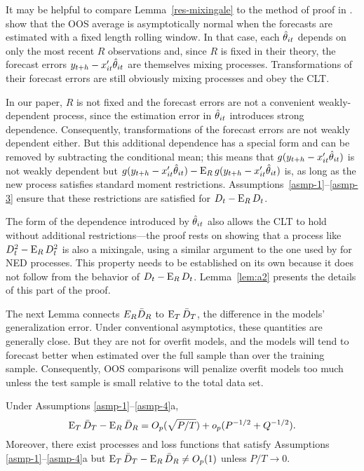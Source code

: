 \documentclass[12pt]{article}
\begin{document}
It may be helpful to compare Lemma~\ref{res-mixingale} to the method
of proof in \citet{GiW:06}. \citet{GiW:06} show that the OOS average
is asymptotically normal when the forecasts are estimated with a fixed
length rolling window. In that case, each $\hat\theta_{it}$ depends on only
the most recent $R$ observations and, since $R$ is fixed in their
theory, the forecast errors $y_{t+h} - x_{it}'\hat\theta_{it}$ are themselves
mixing processes. Transformations of their forecast errors are
still obviously mixing processes and obey the CLT.

In our paper, $R$ is not fixed and the forecast errors are not a
convenient weakly-dependent process, since the estimation error in
$\hat\theta_{it}$ introduces strong dependence. Consequently,
transformations of the forecast errors are not weakly dependent
either. But this additional dependence has a special form and can be
removed by subtracting the conditional mean; this means that $g(y_{t+h} -
x_{it}'\hat\theta_{it})$ is not weakly dependent but $g(y_{t+h} -
x_{it}'\hat\theta_{it}) - \operatorname{E}_R g(y_{t+h} - x_{it}'\hat\theta_{it})$ is, as long as
the new process satisfies standard moment
restrictions. Assumptions~\ref{asmp-1}--\ref{asmp-3} ensure that these
restrictions are satisfied for $D_t - \operatorname{E}_R D_t$.

The form of the dependence introduced by $\hat\theta_{it}$ also allows the CLT
to hold without additional restrictions---the proof rests on showing
that a process like $D_t^2 - \operatorname{E}_R D_t^2$ is also a mixingale, using a
similar argument to the one used by \citet{Jon:97} for NED
processes. This property needs to be established on its own because it
does not follow from the behavior of $D_t - \operatorname{E}_R D_t$.
Lemma~\ref{lem:a2} presents the details of this part of the proof.

The next Lemma connects $E_R \bar{D}_{R}$ to $\operatorname{E}_T \bar{D}_{T}$, the difference in
the models' generalization error. Under conventional asymptotics,
these quantities are generally close. But they are not for overfit
models, and the models will tend to forecast better when estimated over the
full sample than over the training sample. Consequently, OOS
comparisons will penalize overfit models too much unless the test
sample is small relative to the total data set.

\begin{lem} \label{res-convergence}
  Under Assumptions \ref{asmp-1}--\ref{asmp-4}a,
  \begin{equation}\label{eq:7}
    \operatorname{E}_T \bar{D}_{T} - \operatorname{E}_R \bar{D}_{R} = O_p(\sqrt{P/T}) + o_p(P^{-1/2} + Q^{-1/2}).
  \end{equation}
  Moreover, there exist processes and loss functions that satisfy
  Assumptions \ref{asmp-1}--\ref{asmp-4}a but $\operatorname{E}_T \bar{D}_{T} - \operatorname{E}_R \bar{D}_{R}
  \neq O_p(1)$ unless $P/T \to 0$.
\end{lem}
\end{document}
